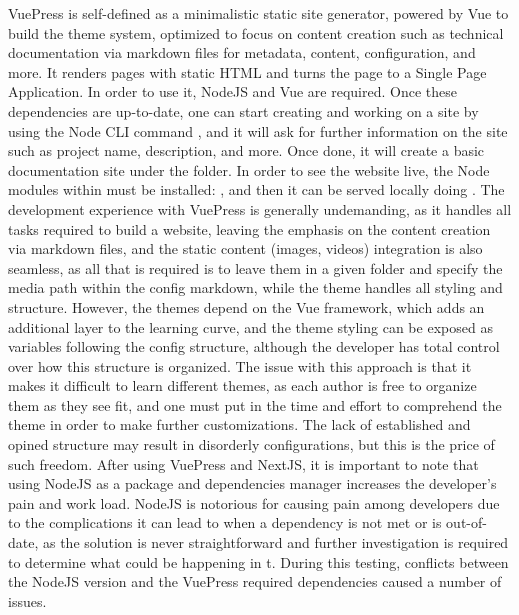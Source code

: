 \markdownRendererDocumentBegin
{}\markdownRendererInterblockSeparator
{}VuePress is self-defined as a minimalistic static site generator, powered by Vue to build the theme system, optimized to focus on content creation such as technical documentation via markdown files for metadata, content, configuration, and more. It renders pages with static HTML and turns the page to a Single Page Application.\markdownRendererInterblockSeparator
{}In order to use it, NodeJS and Vue are required. Once these dependencies are up-to-date, one can start creating and working on a site by using the Node CLI command , and it will ask for further information on the site such as project name, description, and more.\markdownRendererInterblockSeparator
{}Once done, it will create a basic documentation site under the  folder. In order to see the website live, the Node modules within  must be installed: , and then it can be served locally doing .\markdownRendererInterblockSeparator
{}The development experience with VuePress is generally undemanding, as it handles all tasks required to build a website, leaving the emphasis on the content creation via markdown files, and the static content (images, videos) integration is also seamless, as all that is required is to leave them in a given folder and specify the media path within the config markdown, while the theme handles all styling and structure.\markdownRendererInterblockSeparator
{}However, the themes depend on the Vue framework, which adds an additional layer to the learning curve, and the theme styling can be exposed as variables following the config structure, although the developer has total control over how this structure is organized. The issue with this approach is that it makes it difficult to learn different themes, as each author is free to organize them as they see fit, and one must put in the time and effort to comprehend the theme in order to make further customizations. The lack of established and opined structure may result in disorderly configurations, but this is the price of such freedom.\markdownRendererInterblockSeparator
{}After using VuePress and NextJS, it is important to note that using NodeJS as a package and dependencies manager increases the developer's pain and work load. NodeJS is notorious for causing pain among developers due to the complications it can lead to when a dependency is not met or is out-of-date, as the solution is never straightforward and further investigation is required to determine what could be happening in t. During this testing, conflicts between the NodeJS version and the VuePress required dependencies caused a number of issues.\markdownRendererDocumentEnd